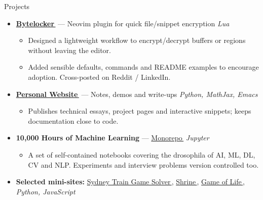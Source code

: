 \documentclass[]{mcdowellcv}
\newcommand{\linkarrow}{\,\raisebox{0.15ex}{\footnotesize$\nearrow$}} %
\begin{document}
\begin{cvsection}{Projects}
\begin{cvsubsection}{}{}{}
\begin{itemize}
      \item \textbf{\href{https://github.com/abaj8494/bytelocker}{Bytelocker\linkarrow}} — Neovim plugin for quick file/snippet encryption
            \hfill \emph{\small Lua}
            \begin{itemize}
              \item Designed a lightweight workflow to encrypt/decrypt buffers or regions without leaving the editor.
              \item Added sensible defaults, commands and README examples to encourage adoption. Cross-posted on Reddit / LinkedIn.
            \end{itemize}

      \item \textbf{\href{https://abaj.ai}{Personal Website\linkarrow}} — Notes, demos and write-ups
            \hfill \emph{\small Python, MathJax, Emacs}
            \begin{itemize}
              \item Publishes technical essays, project pages and interactive snippets; keeps documentation close to code.
            \end{itemize}

      \item \textbf{10,000 Hours of Machine Learning} —
            \href{https://github.com/abaj8494/10khrs-ai-ml-dl}{Monorepo\linkarrow}
            \hfill \emph{\small Jupyter}
            \begin{itemize}
              \item A set of self-contained notebooks covering the drosophila of AI, ML, DL, CV and NLP. Experiments and interview problems version controlled too.
            \end{itemize}

      \item \textbf{Selected mini-sites:}
            \href{https://abaj.ai/projects/csp/train-game/}{Sydney Train Game Solver\linkarrow},\;
            \href{https://abaj8494.github.io/shrine/}{Shrine\linkarrow},\;
            \href{https://abaj8494.github.io/gol/}{Game of Life\linkarrow},\;
            \hfill \emph{\small Python, JavaScript}
    \end{itemize}

  \end{cvsubsection}
\end{cvsection}
\end{document}
